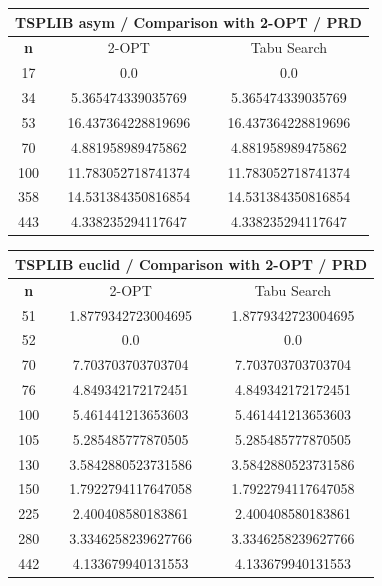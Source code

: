 \documentclass{article}
\begin{document}
\begin{center}
\begin{tabular}{|c|c|c|}
\hline
\multicolumn{3}{|c|}{\textbf{TSPLIB asym / Comparison with 2-OPT / PRD}}\\
\hline
\textbf{n} & 2-OPT & Tabu Search\\
\hline
17 & 0.0 & 0.0\\
\hline
34 & 5.365474339035769 & 5.365474339035769\\
\hline
53 & 16.437364228819696 & 16.437364228819696\\
\hline
70 & 4.881958989475862 & 4.881958989475862\\
\hline
100 & 11.783052718741374 & 11.783052718741374\\
\hline
358 & 14.531384350816854 & 14.531384350816854\\
\hline
443 & 4.338235294117647 & 4.338235294117647\\
\hline
\end{tabular}
\end{center}


\begin{center}
\begin{tabular}{|c|c|c|}
\hline
\multicolumn{3}{|c|}{\textbf{TSPLIB euclid / Comparison with 2-OPT / PRD}}\\
\hline
\textbf{n} & 2-OPT & Tabu Search\\
\hline
51 & 1.8779342723004695 & 1.8779342723004695\\
\hline
52 & 0.0 & 0.0\\
\hline
70 & 7.703703703703704 & 7.703703703703704\\
\hline
76 & 4.849342172172451 & 4.849342172172451\\
\hline
100 & 5.461441213653603 & 5.461441213653603\\
\hline
105 & 5.285485777870505 & 5.285485777870505\\
\hline
130 & 3.5842880523731586 & 3.5842880523731586\\
\hline
150 & 1.7922794117647058 & 1.7922794117647058\\
\hline
225 & 2.400408580183861 & 2.400408580183861\\
\hline
280 & 3.3346258239627766 & 3.3346258239627766\\
\hline
442 & 4.133679940131553 & 4.133679940131553\\
\hline
\end{tabular}
\end{center}
\end{document}
